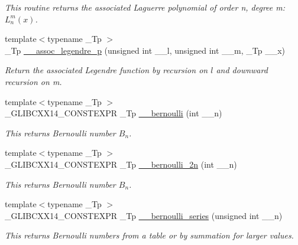 \begin{DoxyCompactItemize}
\begin{DoxyCompactList}\small\item\em This routine returns the associated Laguerre polynomial of order n, degree m\+: $ L_n^m(x) $. \end{DoxyCompactList}\item 
{\footnotesize template$<$typename \+\_\+\+Tp $>$ }\\\+\_\+\+Tp \hyperlink{namespacestd_1_1____detail_a8b31886e334427566b1b00d71052191b}{\+\_\+\+\_\+assoc\+\_\+legendre\+\_\+p} (unsigned int \+\_\+\+\_\+l, unsigned int \+\_\+\+\_\+m, \+\_\+\+Tp \+\_\+\+\_\+x)
\begin{DoxyCompactList}\small\item\em Return the associated Legendre function by recursion on $ l $ and downward recursion on m. \end{DoxyCompactList}\item 
{\footnotesize template$<$typename \+\_\+\+Tp $>$ }\\\+\_\+\+G\+L\+I\+B\+C\+X\+X14\+\_\+\+C\+O\+N\+S\+T\+E\+X\+P\+R \+\_\+\+Tp \hyperlink{namespacestd_1_1____detail_a5dc6cb42a6bcd3258371b6cc93ee12f0}{\+\_\+\+\_\+bernoulli} (int \+\_\+\+\_\+n)
\begin{DoxyCompactList}\small\item\em This returns Bernoulli number $B_n$. \end{DoxyCompactList}\item 
{\footnotesize template$<$typename \+\_\+\+Tp $>$ }\\\+\_\+\+G\+L\+I\+B\+C\+X\+X14\+\_\+\+C\+O\+N\+S\+T\+E\+X\+P\+R \+\_\+\+Tp \hyperlink{namespacestd_1_1____detail_a72c7ddb85ace9619af583ca2acdb0a9b}{\+\_\+\+\_\+bernoulli\+\_\+2n} (int \+\_\+\+\_\+n)
\begin{DoxyCompactList}\small\item\em This returns Bernoulli number $B_n$. \end{DoxyCompactList}\item 
{\footnotesize template$<$typename \+\_\+\+Tp $>$ }\\\+\_\+\+G\+L\+I\+B\+C\+X\+X14\+\_\+\+C\+O\+N\+S\+T\+E\+X\+P\+R \+\_\+\+Tp \hyperlink{namespacestd_1_1____detail_ad3d3e44d340742b0362a8ad95080d315}{\+\_\+\+\_\+bernoulli\+\_\+series} (unsigned int \+\_\+\+\_\+n)
\begin{DoxyCompactList}\small\item\em This returns Bernoulli numbers from a table or by summation for larger values. \end{DoxyCompactList}\item 

\end{DoxyCompactItemize}
